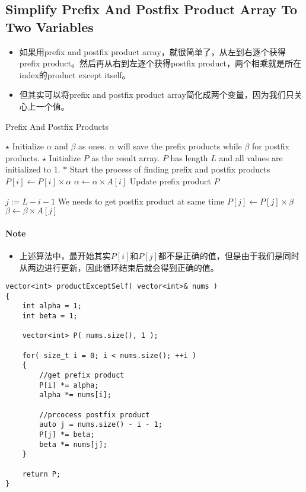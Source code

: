 \subsection{Simplify Prefix And Postfix Product Array To Two Variables}
\begin{CJK*}{UTF8}{gbsn}
\begin{itemize}
\item 如果用prefix and postfix product array，就很简单了，从左到右逐个获得prefix product。然后再从右到左逐个获得postfix product，两个相乘就是所在index的product except itself。
\item 但其实可以将prefix and postfix product array简化成两个变量，因为我们只关心上一个值。
\end{itemize}
\end{CJK*}
\setcounter{algorithm}{0}
\begin{algorithm}[H]
\caption{Prefix And Postfix Products}
\begin{algorithmic}[1]
\State $\star$ Initialize $\alpha$ and $\beta$ as ones. $\alpha$ will save the prefix products while $\beta$ for postfix products.
\State $\star$ Initialize $P$ as the result array. $P$ has length $L$ and all values are initialized to 1.
\State $\ast$ Start the process of finding prefix and postfix products
\State $P[i]\gets P[i] \times \alpha$
\State $\alpha\gets \alpha\times A[i]$ \Comment Update prefix product
\State \Return $P$
\end{algorithmic}
\end{algorithm}
\begin{algorithm}[H]
\begin{algorithmic}[1]
\State $j:=L-i-1$ \Comment We needs to get postfix product at same time
\State $P[j]\gets P[j]\times\beta$ 
\State $\beta\gets\beta\times A[j]$
\EndFor
\EndProcedure
\end{algorithmic}
\end{algorithm}
\begin{CJK*}{UTF8}{gbsn}
\paragraph{Note}
\begin{itemize}
\item 上述算法中，最开始其实$P[i]$和$P[j]$都不是正确的值，但是由于我们是同时从两边进行更新，因此循环结束后就会得到正确的值。
\end{itemize}
\end{CJK*}
\setcounter{lstlisting}{0}
\begin{lstlisting}[style=customc, caption={Prefix And Postfix Product}]
vector<int> productExceptSelf( vector<int>& nums )
{
    int alpha = 1;
    int beta = 1;

    vector<int> P( nums.size(), 1 );

    for( size_t i = 0; i < nums.size(); ++i )
    {
        //get prefix product
        P[i] *= alpha;
        alpha *= nums[i];

        //prcocess postfix product
        auto j = nums.size() - i - 1;
        P[j] *= beta;
        beta *= nums[j];
    }

    return P;
}
\end{lstlisting}
